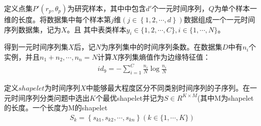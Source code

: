 \documentclass{whutmod}
\begin{document}
		定义点集${{P}'(r_{p},\theta _{p})}$为研究样本，其中中包含${d}'$个一元时间序列，$Q$为单个样本一维的长度。将数据集中每个样本第$j$维$(j\in \left \{1,2,\cdots,d  \right \})$数据组成一个一元时间序列数据集，记为$X$。且
		其中表类样本$y _ { i } \in \{ 1,2 , \cdots , C \} , i \in \{ 1 , \cdots , N \}$。
		
		得到一元时间序列集$X$后，记$N$为序列集中的时间序列条数。在数据集$D$中有$n_{i}$个实例，并且$n_{1}+n_{2},\cdots,n_{n}=N$计算$X$序列集熵值作为边缘特征值：
		\begin{gather}
		id_{9}= - \sum _ { i = 1 } ^ { C } \frac { n _ { i } } { N } \log \frac { n _ { i } } { N }
		\end{gather}
		
		定义$shapelet$为时间序列$X$中能够最大程度区分不同类别时间序列的子序列。在一元时间序列分类问题中选出$K$个最优shapelet并记为$S\in R^{K\times M}$(其中M为shapelet的长度。一个长度为M的shapelet
		\begin{gather}
		S_{k}=\left\{ s _ { k 1 } , s _ { k 2 } , \cdots , s _ { k n } \right\} ( k \in \{ 1 , \cdots , K \} )
		\end{gather}
	
\end{document}

